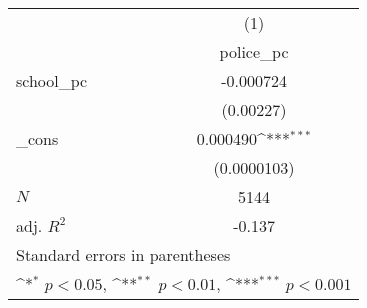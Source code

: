 {
\def\sym#1{\ifmmode^{#1}\else\(^{#1}\)\fi}
\begin{tabular}{l*{1}{c}}
\hline\hline
            &\multicolumn{1}{c}{(1)}\\
            &\multicolumn{1}{c}{police\_pc}\\
\hline
school\_pc   &   -0.000724         \\
            &   (0.00227)         \\
[1em]
\_cons      &    0.000490\sym{***}\\
            & (0.0000103)         \\
\hline
\(N\)       &        5144         \\
adj. \(R^{2}\)&      -0.137         \\
\hline\hline
\multicolumn{2}{l}{\footnotesize Standard errors in parentheses}\\
\multicolumn{2}{l}{\footnotesize \sym{*} \(p<0.05\), \sym{**} \(p<0.01\), \sym{***} \(p<0.001\)}\\
\end{tabular}
}
